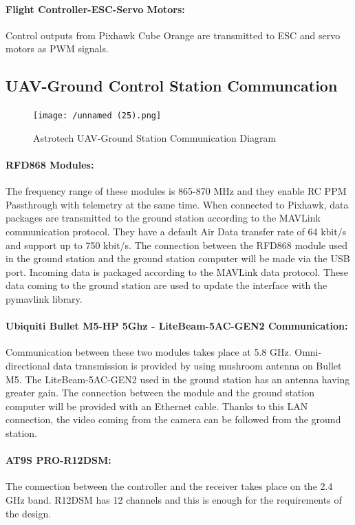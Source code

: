 \documentclass[12pt]{article}
\begin{document}
\paragraph*{Flight Controller-ESC-Servo Motors:} Control outputs from Pixhawk Cube Orange are transmitted to ESC and servo motors as PWM signals.

\subsection{UAV-Ground Control Station Communcation}
\begin{figure}[ht]
 	\centering
 	\texttt{[image: /unnamed (25).png]}
 	\caption{Astrotech UAV-Ground Station Communication Diagram}
        \label{fig:assembly_side}
 \end{figure}
\FloatBarrier
\paragraph*{RFD868 Modules:} The frequency range of these modules is 865-870 MHz and they enable RC PPM Passthrough with telemetry at the same time. When connected to Pixhawk, data packages are transmitted to the ground station according to the MAVLink communication protocol. They have a default Air Data transfer rate of 64 kbit/s and support up to 750 kbit/s. The connection between the RFD868 module used in the ground station and the ground station computer will be made via the USB port. Incoming data is packaged according to the MAVLink data protocol. These data coming to the ground station are used to update the interface with the pymavlink library.

\paragraph*{Ubiquiti Bullet M5-HP 5Ghz - LiteBeam-5AC-GEN2 Communication:} Communication between these two modules takes place at 5.8 GHz. Omni-directional data transmission is provided by using mushroom antenna on Bullet M5. The LiteBeam-5AC-GEN2 used in the ground station has an antenna having greater gain. The connection between the module and the ground station computer will be provided with an Ethernet cable. Thanks to this LAN connection, the video coming from the camera can be followed from the ground station.

\paragraph*{AT9S PRO-R12DSM:} The connection between the controller and the receiver takes place on the 2.4 GHz band. R12DSM has 12 channels and this is enough for the requirements of the design. 
\end{document}
